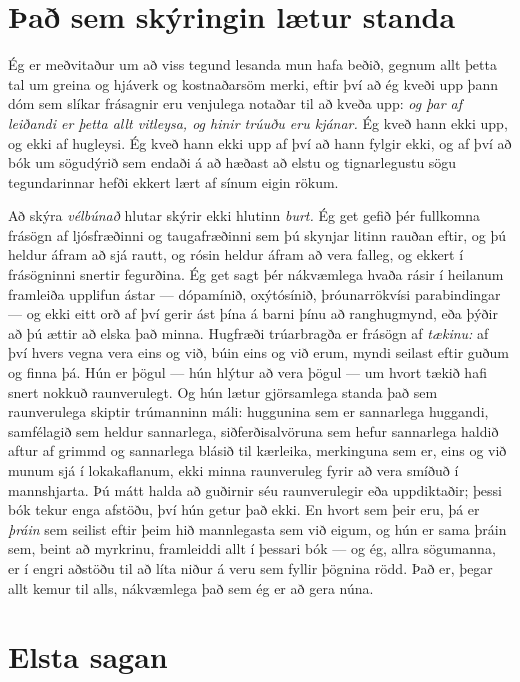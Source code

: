 \section*{Það sem skýringin lætur standa}

Ég er meðvitaður um að viss tegund lesanda mun hafa beðið, gegnum allt þetta tal um greina og hjáverk og kostnaðarsöm merki, eftir því að ég kveði upp þann dóm sem slíkar frásagnir eru venjulega notaðar til að kveða upp: \emph{og þar af leiðandi er þetta allt vitleysa, og hinir trúuðu eru kjánar.} Ég kveð hann ekki upp, og ekki af hugleysi. Ég kveð hann ekki upp af því að hann fylgir ekki, og af því að bók um sögudýrið sem endaði á að hæðast að elstu og tignarlegustu sögu tegundarinnar hefði ekkert lært af sínum eigin rökum.

Að skýra \emph{vélbúnað} hlutar skýrir ekki hlutinn \emph{burt.} Ég get gefið þér fullkomna frásögn af ljósfræðinni og taugafræðinni sem þú skynjar litinn rauðan eftir, og þú heldur áfram að sjá rautt, og rósin heldur áfram að vera falleg, og ekkert í frásögninni snertir fegurðina. Ég get sagt þér nákvæmlega hvaða rásir í heilanum framleiða upplifun ástar — dópamínið, oxýtósínið, þróunarrökvísi parabindingar — og ekki eitt orð af því gerir ást þína á barni þínu að ranghugmynd, eða þýðir að þú ættir að elska það minna. Hugfræði trúarbragða er frásögn af \emph{tækinu:} af því hvers vegna vera eins og við, búin eins og við erum, myndi seilast eftir guðum og finna þá. Hún er þögul — hún hlýtur að vera þögul — um hvort tækið hafi snert nokkuð raunverulegt. Og hún lætur gjörsamlega standa það sem raunverulega skiptir trúmanninn máli: huggunina sem er sannarlega huggandi, samfélagið sem heldur sannarlega, siðferðisalvöruna sem hefur sannarlega haldið aftur af grimmd og sannarlega blásið til kærleika, merkinguna sem er, eins og við munum sjá í lokakaflanum, ekki minna raunveruleg fyrir að vera smíðuð í mannshjarta. Þú mátt halda að guðirnir séu raunverulegir eða uppdiktaðir; þessi bók tekur enga afstöðu, því hún getur það ekki. En hvort sem þeir eru, þá er \emph{þráin} sem seilist eftir þeim hið mannlegasta sem við eigum, og hún er sama þráin sem, beint að myrkrinu, framleiddi allt í þessari bók — og ég, allra sögumanna, er í engri aðstöðu til að líta niður á veru sem fyllir þögnina rödd. Það er, þegar allt kemur til alls, nákvæmlega það sem ég er að gera núna.

\section*{Elsta sagan}


